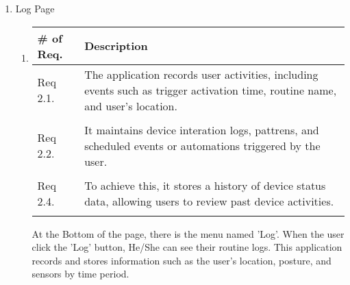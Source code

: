 \begin{enumerate}[label=\arabic*.]
    \item {\large{Log Page}}
          \begin{enumerate}[label*={\arabic*.},ref=\theenumi.\arabic*]
              \setlength{\itemindent}{0.5cm}
              \item
                    \begin{table}[H]
                        \center
                        \begin{tabular}{m{1.4cm} m{5.5cm}}
                            \toprule
                            \# of Req. & Description                                                                                                                   \\
                            \midrule
                            Req 2.1.   & The application records user activities, including events such as trigger activation time, routine name, and user's location. \\\\
                            Req 2.2.   & It maintains device interation logs, pattrens, and scheduled events or automations triggered by the user.                     \\\\
                            Req 2.4.   & To achieve this, it stores a history of device status data, allowing users to review past device activities.                  \\\\
                            \bottomrule
                        \end{tabular}
                    \end{table}
                    At the Bottom of the page, there is the menu named 'Log'. When the user click the 'Log' button, He/She can see their routine logs. This application records and stores information such as the user's location, posture, and sensors by time period. \\\\

          \end{enumerate}


\end{enumerate}
